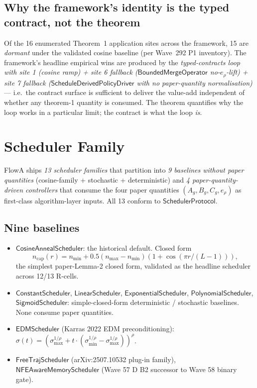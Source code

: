 \documentclass[journal,twocolumn,final]{IEEEtran}
\newcommand{\egap}{e_\rho}
\newcommand{\sheetA}{A_g}
\newcommand{\sheetB}{B_g}
\newcommand{\sheetC}{C_g}
\begin{document}
\subsection{Why the framework's identity is the typed contract, not the theorem}

Of the 16 enumerated Theorem~1 application sites across the framework, 15 are
\emph{dormant} under the validated cosine baseline (per Wave~292 P1
inventory). The framework's headline empirical wins are produced by the
\emph{typed-contracts loop with site 1 (cosine ramp) + site 6 fallback
($\mathsf{BoundedMergeOperator}$ no-$\egap$-lift) + site 7 fallback
($\mathsf{ScheduleDerivedPolicyDriver}$ with no paper-quantity normalisation)}
--- i.e.\ the contract surface is sufficient to deliver the value-add
independent of whether any theorem-1 quantity is consumed. The theorem
quantifies why the loop works in a particular limit; the contract is what the
loop \emph{is}.

\section{Scheduler Family}\label{sec:schedulers}

FlowA ships \emph{13 scheduler families} that partition into \emph{9 baselines
without paper quantities} (cosine-family + stochastic + deterministic) and
\emph{4 paper-quantity-driven controllers} that consume the four paper
quantities $(\sheetA, \sheetB, \sheetC, \egap)$ as first-class algorithm-layer
inputs. All 13 conform to $\mathsf{SchedulerProtocol}$.

\subsection{Nine baselines}

\begin{itemize}
\item $\mathsf{CosineAnnealScheduler}$: the historical default. Closed form
\begin{equation}\label{eq:cosine}
n_\mathrm{cap}(r) = n_\mathrm{min} + 0.5 (n_\mathrm{max} - n_\mathrm{min})
(1 + \cos(\pi r / (L - 1))),
\end{equation}
the simplest paper-Lemma-2 closed form, validated as the
headline scheduler across 12/13 R-cells.
\item $\mathsf{ConstantScheduler}$, $\mathsf{LinearScheduler}$,
$\mathsf{ExponentialScheduler}$, $\mathsf{PolynomialScheduler}$,
$\mathsf{SigmoidScheduler}$: simple-closed-form deterministic / stochastic
baselines. None consume paper quantities.
\item $\mathsf{EDMScheduler}$ (Karras 2022 EDM preconditioning):
$\sigma(t) = (\sigma_\mathrm{max}^{1/\rho} + t \cdot (\sigma_\mathrm{min}^{1/\rho}
- \sigma_\mathrm{max}^{1/\rho}))^\rho$.
\item $\mathsf{FreeTrajScheduler}$ (arXiv:2507.10532 plug-in family),
$\mathsf{NFEAwareMemoryScheduler}$ (Wave 57 D B2 successor to Wave 58 binary
gate).
\end{itemize}
\end{document}
